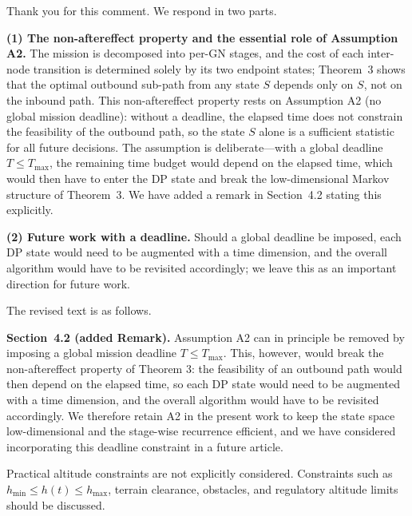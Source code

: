 \begin{revresponse}[]
	Thank you for this comment. We respond in two parts.

	\textbf{(1) The non-aftereffect property and the essential role of Assumption A2.} The mission is decomposed into per-GN stages, and the cost of each inter-node transition is determined solely by its two endpoint states; Theorem~3 shows that the optimal outbound sub-path from any state $S$ depends only on $S$, not on the inbound path. This non-aftereffect property rests on Assumption A2 (no global mission deadline): without a deadline, the elapsed time does not constrain the feasibility of the outbound path, so the state $S$ alone is a sufficient statistic for all future decisions. The assumption is deliberate---with a global deadline $T\le T_{\max}$, the remaining time budget would depend on the elapsed time, which would then have to enter the DP state and break the low-dimensional Markov structure of Theorem~3. We have added a remark in Section~4.2 stating this explicitly.

	\textbf{(2) Future work with a deadline.} Should a global deadline be imposed, each DP state would need to be augmented with a time dimension, and the overall algorithm would have to be revisited accordingly; we leave this as an important direction for future work.

	The revised text is as follows.
	\begin{changes}
		\textbf{Section~4.2 (added Remark).} Assumption A2 can in principle be removed by imposing a global mission deadline $T \le T_{\max}$. This, however, would break the non-aftereffect property of Theorem 3: the feasibility of an outbound path would then depend on the elapsed time, so each DP state would need to be augmented with a time dimension, and the overall algorithm would have to be revisited accordingly. We therefore retain A2 in the present work to keep the state space low-dimensional and the stage-wise recurrence efficient, and we have considered incorporating this deadline constraint in a future article.
	\end{changes}
\end{revresponse}

\begin{revcomment}
	Practical altitude constraints are not explicitly considered. Constraints such as $h_{\min} \le h(t) \le h_{\max}$, terrain clearance, obstacles, and regulatory altitude limits should be discussed.
\end{revcomment}

